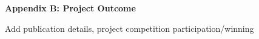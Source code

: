 
\vspace*{5cm}
\begin{centering}
    \large
{\LARGE\bf Appendix B: Project Outcome}\\
\end{centering}

\newpage

Add publication details, project competition participation/winning